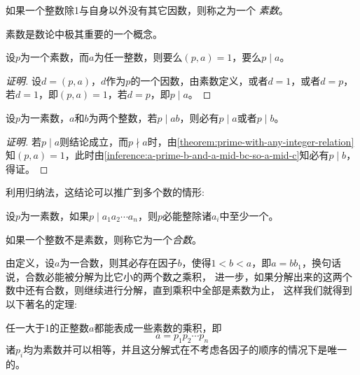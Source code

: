 \begin{definition}
  如果一个整数除1与自身以外没有其它因数，则称之为一个 \emph{素数}。
\end{definition}

素数是数论中极其重要的一个概念。

\begin{theorem}
  \label{theorem:prime-with-any-integer-relation}
  设$p$为一个素数，而$a$为任一整数，则要么$(p,a)=1$，要么$p \mid a$。
\end{theorem}

\begin{proof}[证明]
  设$d=(p,a)$，$d$作为$p$的一个因数，由素数定义，或者$d=1$，或者$d=p$，若$d=1$，即$(p,a)=1$，若$d=p$，即$p \mid a$。
\end{proof}

\begin{inference}
  设$p$为一素数，$a$和$b$为两个整数，若$p \mid ab$，则必有$p \mid a$或者$p \mid b$。
\end{inference}

\begin{proof}[证明]
  若$p \mid a$则结论成立，而$p \nmid a$时，由\autoref{theorem:prime-with-any-integer-relation}知$(p,a)=1$，此时由\autoref{inference:a-prime-b-and-a-mid-bc-so-a-mid-c}知必有$p \mid b$，得证。
\end{proof}

利用归纳法，这结论可以推广到多个数的情形:
\begin{inference}
  设$p$为一素数，如果$p \mid a_1a_2\cdots a_n$，则$p$必能整除诸$a_i$中至少一个。
\end{inference}

\begin{definition}
  如果一个整数不是素数，则称它为一个\emph{合数}。
\end{definition}

由定义，设$a$为一合数，则其必存在因子$b$，使得$1<b<a$，即$a=bb_1$，换句话说，合数必能被分解为比它小的两个数之乘积，
进一步，如果分解出来的这两个数中还有合数，则继续进行分解，直到乘积中全部是素数为止，
这样我们就得到以下著名的定理:

\begin{theorem}[算术基本定理]
  \label{theorem:arithmetic-base-theorem}
  任一大于1的正整数$a$都能表成一些素数的乘积，即
  \[ a=p_1p_2 \cdots p_n \]
  诸$p_i$均为素数并可以相等，并且这分解式在不考虑各因子的顺序的情况下是唯一的。
\end{theorem}


